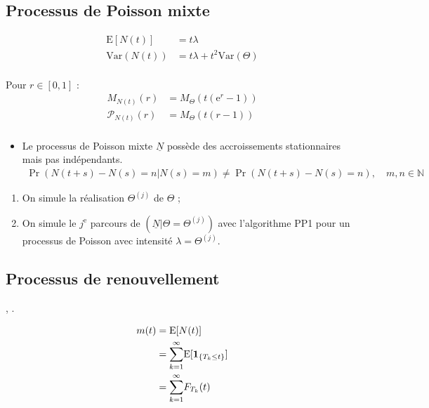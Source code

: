 \documentclass[10pt, french]{article}
\begin{document}
\begin{multicols*}{2}
\columnbreak
\subsection{Processus de Poisson mixte}
\begin{align*}
	\text{E}[N(t)]
	&=	t\lambda	\\
	\text{Var}(N(t))
	&=	t\lambda	 + t^{2}\text{Var}(\Theta)\\
\end{align*}

Pour $r \in [0, 1]$ :
\begin{align*}
	M_{N(t)}(r)
	&=	M_{\Theta}\left( t(\textrm{e}^{r} - 1)\right)	\\
	\mathcal{P}_{N(t)}(r)
	&=	M_{\Theta}\left( t(r - 1)\right)	\\
\end{align*}

\begin{itemize}
	\item	Le processus de Poisson mixte $\underline{N}$ possède des accroissements stationnaires mais pas indépendants.
		\begin{align*}
		\Pr\left(N(t + s) - N(s) = n | N(s) = m\right)
		\neq		\Pr\left(N(t + s)	-	N(s)	=	n\right), \quad m, n \in \mathbb{N}
		\end{align*}
\end{itemize}

\begin{algo2}
\begin{enumerate}
	\item	On simule la réalisation $\Theta^{(j)}$ de $\Theta$ ;
	\item	On simule le $j^{\text{e}}$ parcours de $(\underline{N} | \Theta = \Theta^{(j)})$ avec l'algorithme PP1 pour un processus de Poisson avec intensité $\lambda = \Theta^{(j)}$.
\end{enumerate}
\end{algo2}


\columnbreak
\subsection{Processus de renouvellement}
, .

\begin{align*}
	m(t)
	&=	\text{E}[N(t)]	\\
	&=	\overset{\infty}{\underset{k = 1}{\sum}}	\text{E}[\bm{1}_{\{T_{k} \leq t\}}]\\
	&=	\overset{\infty}{\underset{k = 1}{\sum}}	 F_{T_{k}}(t)\\
\end{align*}



\end{multicols*}
\end{document}
